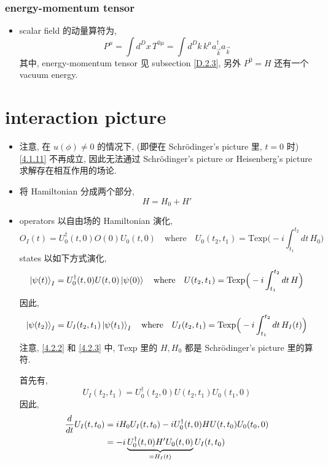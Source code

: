 \subsubsection{energy-momentum tensor}
\begin{itemize}
	\item scalar field 的动量算符为,
	\begin{equation}
		P^\mu = \int d^D x \, T^{0 \mu} = \int d^D k \, k^\mu a^\dag_{\vec{k}} a_{\vec{k}}
	\end{equation}
	其中, energy-momentum tensor 见 subsection \ref{D.2.3}, 另外 $P^0 = H$ 还有一个 vacuum energy.
\end{itemize}

\section{interaction picture}
\begin{itemize}
	\item 注意, 在 $u(\phi) \neq 0$ 的情况下, (即便在 Schrödinger's picture 里, $t = 0$ 时) \eqref{4.1.11} 不再成立, 因此无法通过 Schrödinger's picture or Heisenberg's picture 求解存在相互作用的场论.
	
	\item 将 Hamiltonian 分成两个部分,
	\begin{equation}
		H = H_0 + H'
	\end{equation}
	
	\item operators 以自由场的 Hamiltonian 演化,
	\begin{equation} \label{4.2.2}
		O_I(t) = U_0^\dag(t, 0) O(0) U_0(t, 0) \quad \text{where} \quad U_0(t_2, t_1) = \mathrm{Texp} \Big( - i \int_{t_1}^{t_2} dt \, H_0 \Big)
	\end{equation}
	states 以如下方式演化,
	\begin{equation} \label{4.2.3}
		\ket{\psi(t)}_I = U_0^\dag(t, 0) U(t, 0) \ket{\psi(0)} \quad \text{where} \quad U(t_2, t_1) = \mathrm{Texp} \Big( - i \int_{t_1}^{t_2} dt \, H \Big)
	\end{equation}
	因此,
	\begin{equation}
		\ket{\psi(t_2)}_I = U_I(t_2, t_1) \ket{\psi(t_1)}_I \quad \text{where} \quad U_I(t_2, t_1) = \mathrm{Texp} \Big( - i \int_{t_1}^{t_2} dt \, H_I(t) \Big)
	\end{equation}
	注意, \eqref{4.2.2} 和 \eqref{4.2.3} 中, $\mathrm{Texp}$ 里的 $H, H_0$ 都是 Schrödinger's picture 里的算符.
	
	\begin{tcolorbox}[title=calculation:]
		首先有,
		\begin{equation}
			U_I(t_2, t_1) = U_0^\dag(t_2, 0) U(t_2, t_1) U_0(t_1, 0)
		\end{equation}
		因此,
		\begin{align}
			\frac{d}{dt} U_I(t, t_0) &= i H_0 U_I(t, t_0) - i U_0^\dag(t, 0) H U(t, t_0) U_0(t_0, 0) \notag \\
			&= - i \underbrace{U_0^\dag(t, 0) H' U_0(t, 0)}_{= H_I(t)} U_I(t, t_0)
		\end{align}
	\end{tcolorbox}
\end{itemize}

